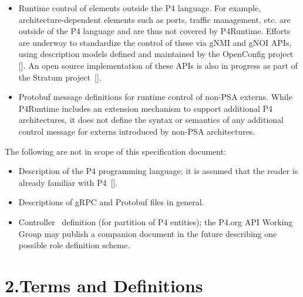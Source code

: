 \documentclass[11pt]{article}
\begin{document}
{%
\begin{itemize}[noitemsep,topsep=\mdcompacttopsep]%

\item{}Runtime control of elements outside the P4 language. For example,
architecture-dependent elements such as ports, traffic management, etc. are
outside of the P4 language and are thus not covered by P4Runtime. Efforts are
underway to standardize the control of these via gNMI and gNOI APIs, using
description models defined and maintained by the OpenConfig project
[]. An open source implementation of these APIs is also in progress
as part of the Stratum project~[].%

\item{}Protobuf message definitions for runtime control of non-PSA externs. While
P4Runtime includes an extension mechanism to support additional P4
architectures, it does not define the syntax or semantics of any additional
control message for externs introduced by non-PSA architectures.%
\end{itemize}%

\noindent{}The following are not in scope of this specification document:%

\begin{itemize}[noitemsep,topsep=\mdcompacttopsep]%

\item{}Description of the P4 programming language; it is assumed that the reader is
already familiar with P4~[].%

\item{}Descriptions of gRPC and Protobuf files in general.%

\item{}Controller~ definition (for partition of
P4 entities); the P4.org API Working Group may publish a companion document in
the future describing one possible role definition scheme.%
\end{itemize}%

\section{2.\hspace*{0.5em}Terms and Definitions}\label{sec-terms-and-definitions}%

}
\end{document}
